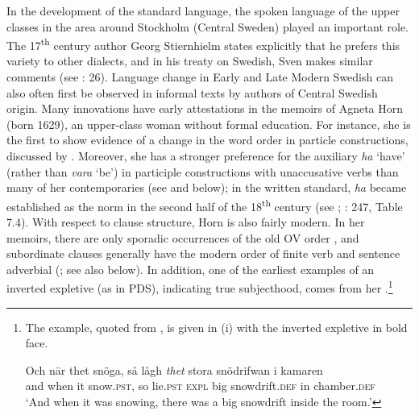 \documentclass[output=paper]{langscibook}
\begin{document}
In the development of the standard language, the spoken language of the upper classes in the area around Stockholm (Central Sweden) played an important role. The 17\textsuperscript{th} century author Georg Stiernhielm states explicitly that he prefers this variety to other dialects, and in his treaty on Swedish, Sven \citet{Hof1753} makes similar comments (see \citealt{Widmark2000}: 26). Language change in Early and Late Modern Swedish can also often first be observed in informal texts by authors of Central Swedish origin. Many innovations have early attestations in the memoirs of Agneta Horn (born 1629), an upper-class woman without formal education. For instance, she is the first to show evidence of a change in the word order in particle constructions, discussed by . Moreover, she has a stronger preference for the auxiliary \textit{ha} ‘have’ (rather than \textit{vara} ‘be’) in participle constructions with unaccusative verbs than many of her contemporaries (see \citealt{Larsson2009} and below); in the written standard, \textit{ha} became established as the norm in the second half of the 18\textsuperscript{th} century (see \citealt{Johannisson1945}; \citealt{Larsson2009}: 247, Table 7.4). With respect to clause structure, Horn is also fairly modern. In her memoirs, there are only sporadic occurrences of the old OV order \citep{Petzell2011}, and subordinate clauses generally have the modern order of finite verb and sentence adverbial (\citealt{Falk1993}; see also  below). In addition, one of the earliest examples of an inverted expletive (as in PDS), indicating true subjecthood, comes from her \citep[268]{Falk1993}.\footnote{The example, quoted from \citet[268]{Falk1993}, is given in (i) with the inverted expletive in bold face.

\ea\gll Och  när    thet  snöga,    så  lågh \textit{thet} stora  snödrifwan    i    kamaren\\
        and  when  it      snow.\textsc{pst},  so  lie.\textsc{pst}  \textsc{expl}  big    snowdrift.\textsc{def} in  chamber.\textsc{def}\\
   \glt ‘And when it was snowing, there was a big snowdrift inside the room.’
   \z}
\end{document}
